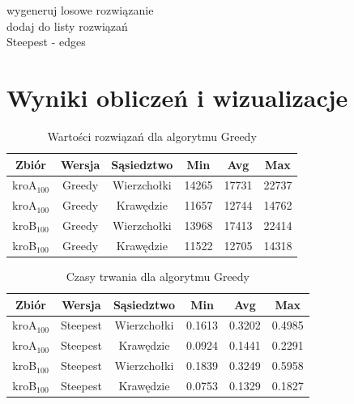 \documentclass{article}
\begin{document}
\vspace{10mm}

\begin{algorithm}[H]
     
    wygeneruj losowe rozwiązanie\\
    dodaj do listy rozwiązań\\
\caption{Steepest - edges}
\end{algorithm}

\vspace{10mm}


\section{Wyniki obliczeń i wizualizacje}

\begin{table}[h!]
\centering
\begin{tabular}{ |c|c|c|c|c|c| } 
 \hline
 Zbiór & Wersja & Sąsiedztwo & Min & Avg & Max \\ 
  \hline
 kroA$_{100}$ & Greedy & Wierzchołki & 14265 & 17731 & 22737 \\ 
  \hline
 kroA$_{100}$ & Greedy & Krawędzie & 11657 & 12744 & 14762 \\ 
 \hline
 kroB$_{100}$ & Greedy & Wierzchołki & 13968 & 17413 & 22414 \\ 
 \hline
 kroB$_{100}$ & Greedy & Krawędzie & 11522 & 12705 & 14318 \\ 
 \hline
\end{tabular}
\caption{Wartości rozwiązań dla algorytmu Greedy}
\end{table}

\begin{table}[h!]
\centering
\begin{tabular}{ |c|c|c|c|c|c| } 
 \hline
 Zbiór & Wersja & Sąsiedztwo & Min & Avg & Max \\ 
 \hline
 kroA$_{100}$ & Steepest & Wierzchołki & 0.1613 & 0.3202 & 0.4985 \\ 
  \hline
 kroA$_{100}$ & Steepest & Krawędzie & 0.0924  & 0.1441 &  0.2291 \\ 
 \hline
 kroB$_{100}$ & Steepest & Wierzchołki & 0.1839 & 0.3249 &  0.5958 \\ 
 \hline
 kroB$_{100}$ & Steepest & Krawędzie & 0.0753 &  0.1329 &  0.1827 \\ 
 \hline
\end{tabular}
\caption{Czasy trwania dla algorytmu Greedy}
\end{table}
\end{document}
